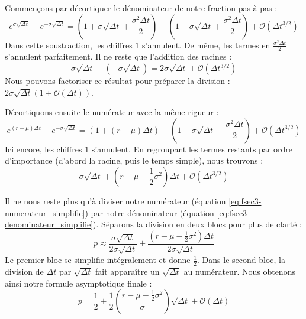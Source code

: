 Commençons par décortiquer le dénominateur de notre fraction pas à pas :
\begin{equation}
    \label{eq:fsec3-denominateur_taylor}
    e^{\sigma \sqrt{\Delta t}} - e^{-\sigma \sqrt{\Delta t}} = \left( 1 + \sigma \sqrt{\Delta t} + \frac{\sigma^2 \Delta t}{2} \right) - \left( 1 - \sigma \sqrt{\Delta t} + \frac{\sigma^2 \Delta t}{2} \right) + \mathcal{O}(\Delta t^{3/2})
\end{equation}
Dans cette soustraction, les chiffres $1$ s'annulent. De même, les termes en $\frac{\sigma^2 \Delta t}{2}$ s'annulent parfaitement. Il ne reste que l'addition des racines :
\begin{equation}
    \label{eq:fsec3-denominateur_simplifie}
    \sigma \sqrt{\Delta t} - (-\sigma \sqrt{\Delta t}) = 2 \sigma \sqrt{\Delta t} + \mathcal{O}(\Delta t^{3/2})
\end{equation}
Nous pouvons factoriser ce résultat pour préparer la division : $2 \sigma \sqrt{\Delta t} (1 + \mathcal{O}(\Delta t))$.

Décortiquons ensuite le numérateur avec la même rigueur :
\begin{equation}
    \label{eq:fsec3-numerateur_taylor}
    e^{(r-\mu)\Delta t} - e^{-\sigma \sqrt{\Delta t}} = \left( 1 + (r-\mu)\Delta t \right) - \left( 1 - \sigma \sqrt{\Delta t} + \frac{\sigma^2 \Delta t}{2} \right) + \mathcal{O}(\Delta t^{3/2})
\end{equation}
Ici encore, les chiffres $1$ s'annulent. En regroupant les termes restants par ordre d'importance (d'abord la racine, puis le temps simple), nous trouvons :
\begin{equation}
    \label{eq:fsec3-numerateur_simplifie}
    \sigma \sqrt{\Delta t} + \left( r - \mu - \frac{1}{2}\sigma^2 \right)\Delta t + \mathcal{O}(\Delta t^{3/2})
\end{equation}

Il ne nous reste plus qu'à diviser notre numérateur (équation \ref{eq:fsec3-numerateur_simplifie}) par notre dénominateur (équation \ref{eq:fsec3-denominateur_simplifie}). Séparons la division en deux blocs pour plus de clarté :
\begin{equation}
    \label{eq:fsec3-division_detaillee}
    p \approx \frac{\sigma \sqrt{\Delta t}}{2 \sigma \sqrt{\Delta t}} + \frac{\left( r - \mu - \frac{1}{2}\sigma^2 \right)\Delta t}{2 \sigma \sqrt{\Delta t}}
\end{equation}
Le premier bloc se simplifie intégralement et donne $\frac{1}{2}$. 
Dans le second bloc, la division de $\Delta t$ par $\sqrt{\Delta t}$ fait apparaître un $\sqrt{\Delta t}$ au numérateur. Nous obtenons ainsi notre formule asymptotique finale :
\begin{equation}
    \label{eq:fsec3-proba_rn_taylor}
    p = \frac{1}{2} + \frac{1}{2} \left( \frac{r - \mu - \frac{1}{2}\sigma^2}{\sigma} \right) \sqrt{\Delta t} + \mathcal{O}(\Delta t)
\end{equation}


